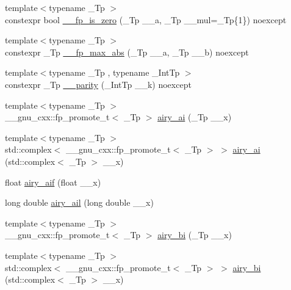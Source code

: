 \begin{DoxyCompactItemize}
\item 
{\footnotesize template$<$typename \+\_\+\+Tp $>$ }\\constexpr bool \hyperlink{namespace____gnu__cxx_aea3be1eb8940437aa8571ab8654af660}{\+\_\+\+\_\+fp\+\_\+is\+\_\+zero} (\+\_\+\+Tp \+\_\+\+\_\+a, \+\_\+\+Tp \+\_\+\+\_\+mul=\+\_\+\+Tp\{1\}) noexcept
\item 
{\footnotesize template$<$typename \+\_\+\+Tp $>$ }\\constexpr \+\_\+\+Tp \hyperlink{namespace____gnu__cxx_a85d72dd4ca7056d3a5979d03251ec38a}{\+\_\+\+\_\+fp\+\_\+max\+\_\+abs} (\+\_\+\+Tp \+\_\+\+\_\+a, \+\_\+\+Tp \+\_\+\+\_\+b) noexcept
\item 
{\footnotesize template$<$typename \+\_\+\+Tp , typename \+\_\+\+Int\+Tp $>$ }\\constexpr \+\_\+\+Tp \hyperlink{namespace____gnu__cxx_a35c2cbd743275d2ba01b42aeb5e65201}{\+\_\+\+\_\+parity} (\+\_\+\+Int\+Tp \+\_\+\+\_\+k) noexcept
\item 
{\footnotesize template$<$typename \+\_\+\+Tp $>$ }\\\+\_\+\+\_\+gnu\+\_\+cxx\+::fp\+\_\+promote\+\_\+t$<$ \+\_\+\+Tp $>$ \hyperlink{group__mathsf__gnu_gac84f8c4ad00ee677ad4d0b785925d983}{airy\+\_\+ai} (\+\_\+\+Tp \+\_\+\+\_\+x)
\item 
{\footnotesize template$<$typename \+\_\+\+Tp $>$ }\\std\+::complex$<$ \+\_\+\+\_\+gnu\+\_\+cxx\+::fp\+\_\+promote\+\_\+t$<$ \+\_\+\+Tp $>$ $>$ \hyperlink{group__mathsf__gnu_gacf37e6c9f186ade270b476c8e5826fb9}{airy\+\_\+ai} (std\+::complex$<$ \+\_\+\+Tp $>$ \+\_\+\+\_\+x)
\item 
float \hyperlink{group__mathsf__gnu_gaf317ba724c44b3a8271fe341d9870173}{airy\+\_\+aif} (float \+\_\+\+\_\+x)
\item 
long double \hyperlink{group__mathsf__gnu_ga800fdb61c672ae1831f4ca4250d657de}{airy\+\_\+ail} (long double \+\_\+\+\_\+x)
\item 
{\footnotesize template$<$typename \+\_\+\+Tp $>$ }\\\+\_\+\+\_\+gnu\+\_\+cxx\+::fp\+\_\+promote\+\_\+t$<$ \+\_\+\+Tp $>$ \hyperlink{group__mathsf__gnu_ga33c172cab7f8e9c99537444c7e30801a}{airy\+\_\+bi} (\+\_\+\+Tp \+\_\+\+\_\+x)
\item 
{\footnotesize template$<$typename \+\_\+\+Tp $>$ }\\std\+::complex$<$ \+\_\+\+\_\+gnu\+\_\+cxx\+::fp\+\_\+promote\+\_\+t$<$ \+\_\+\+Tp $>$ $>$ \hyperlink{group__mathsf__gnu_ga27cfc90cf84fae2acb2d55a9409ea49c}{airy\+\_\+bi} (std\+::complex$<$ \+\_\+\+Tp $>$ \+\_\+\+\_\+x)

\end{DoxyCompactItemize}

